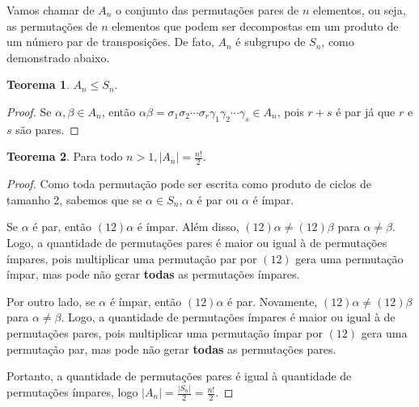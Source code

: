 \documentclass[a4paper,portuguese,11pt,twoside, leqno]{book}
\theoremstyle{definition}
\newtheorem{theorem}{Teorema}[section]
\newtheorem{example}{Exemplo}[section]
\begin{document}
	\par\vspace{0.3cm} Vamos chamar de $A_n$ o conjunto das permutações pares de $n$ elementos, ou seja, as permutações de $n$ elementos que podem ser decompostas em um produto de um número par de transposições. De fato, $A_n$ é subgrupo de $S_n$, como demonstrado abaixo.
	\begin{theorem}
		\label{grupo alternante subgrupo de S_n}
		$A_n \leq S_n$.
	\end{theorem}
	\begin{proof}
	Se $\alpha, \beta \in A_n$, então $\alpha\beta = \sigma_1\sigma_2\cdots\sigma_r\gamma_1\gamma_2\cdots\gamma_s \in A_n$, pois $r+s$ é par já que $r$ e $s$ são pares. \end{proof}
	\begin{theorem}
		\label{ordem do grupo alternante}
		Para todo $n>1, |A_n| = \displaystyle{\frac{n!}{2}}$.\end{theorem}
	\begin{proof}
		Como toda permutação pode ser escrita como produto de ciclos de tamanho 2, sabemos que se $\alpha\in S_n$, $\alpha$ é par ou $\alpha$ é ímpar. 
		\par\vspace{0.3cm} Se $\alpha$ é par, então $(12)\alpha$ é ímpar. Além disso, $(12)\alpha\neq (12)\beta$ para $\alpha\neq\beta$. Logo, a quantidade de permutações pares é maior ou igual à de permutações ímpares, pois multiplicar uma permutação par por $(12)$ gera uma permutação ímpar, mas pode não gerar \textbf{todas} as permutações ímpares.
		\par\vspace{0.3cm} Por outro lado, se $\alpha$ é ímpar, então $(12)\alpha$ é par. Novamente, $(12)\alpha\neq (12)\beta$ para $\alpha\neq\beta$. Logo, a quantidade de permutações ímpares é maior ou igual à de permutações pares, pois multiplicar uma permutação ímpar por $(12)$ gera uma permutação par, mas pode não gerar \textbf{todas} as permutações pares. 
		\par\vspace{0.3cm} Portanto, a quantidade de permutações pares é igual à quantidade de permutações ímpares, logo $|A_n| = \displaystyle{\frac{|S_n|}{2} = \frac{n!}{2} }$. \end{proof} 
	
	
\end{document}
